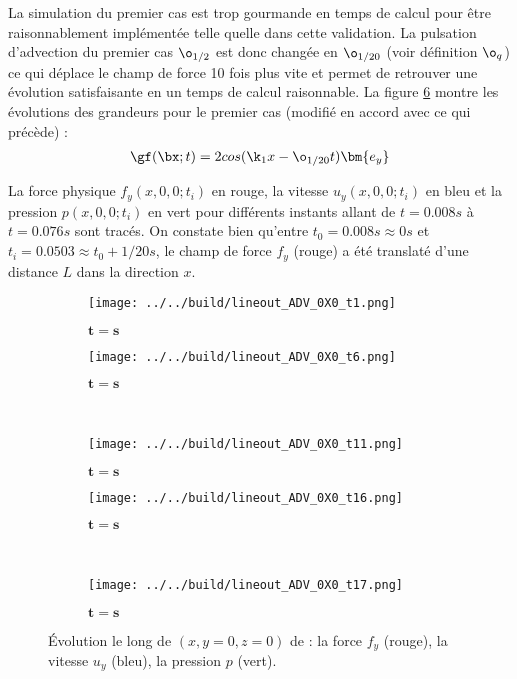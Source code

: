 La simulation du premier cas est trop gourmande en temps de calcul pour être raisonnablement implémentée telle quelle dans cette validation. La pulsation d'advection du premier cas $\o_{1/2}$ est donc changée en $\o_{1/20}$ (voir définition $\o_q$) ce qui déplace le champ de force 10 fois plus vite et permet de retrouver une évolution satisfaisante en un temps de calcul raisonnable. La figure \ref{fig : 0X0} montre les évolutions des grandeurs pour le premier cas (modifié en accord avec ce qui précède) :
\begin{align}
\gf(\bx;t) = 2cos(\k_1 x - \o_{1/20}t) \bm{e_y}
\end{align} 

La force physique $f_y(x,0,0;t_i)$ en rouge, la vitesse $u_y(x,0,0;t_i)$ en bleu et la pression $p(x,0,0;t_i)$ en vert pour différents instants allant de $t=0.008s$ à $t=0.076s$ sont tracés. On constate bien qu'entre $t_0=0.008s \approx 0s$ et $t_i = 0.0503 \approx t_0 + 1/20 s$, le champ de force $f_y$ (rouge) a été translaté d'une distance $L$ dans la direction $x$. 

\begin{figure}
\begin{center}
	\begin{subfigure}[t]{0.4\textwidth}                                                                                                                                   
		\texttt{[image: ../../build/lineout\_ADV\_0X0\_t1.png]}
		\caption{ $\bm{t=s}$}
		\label{fig : 0X0_t1}
	\end{subfigure}\hfill
	\begin{subfigure}[t]{0.4\textwidth}
		\texttt{[image: ../../build/lineout\_ADV\_0X0\_t6.png]}
		\caption{ $\bm{t=s}$}
		\label{fig : 0X0_t6}
	\end{subfigure}
\\
	\begin{subfigure}[t]{0.4\textwidth}
		\texttt{[image: ../../build/lineout\_ADV\_0X0\_t11.png]}
		\caption{ $\bm{t=s}$}
		\label{fig : 0X0_t11}
	\end{subfigure}\hfill
	\begin{subfigure}[t]{0.4\textwidth}
		\texttt{[image: ../../build/lineout\_ADV\_0X0\_t16.png]}
		\caption{ $\bm{t=s}$}
		\label{fig : 0X0_t16}
	\end{subfigure}
\\
	\begin{subfigure}[t]{0.4\textwidth}
		\texttt{[image: ../../build/lineout\_ADV\_0X0\_t17.png]}
		\caption{ $\bm{t=s}$}
		\label{fig : 0X0_t21}
	\end{subfigure}	
\end{center}
\caption{Évolution le long de $(x,y=0,z=0)$ de : la force $f_y$ (rouge), la vitesse $u_y$ (bleu), la pression $p$ (vert).}
\label{fig : 0X0}
\end{figure}

